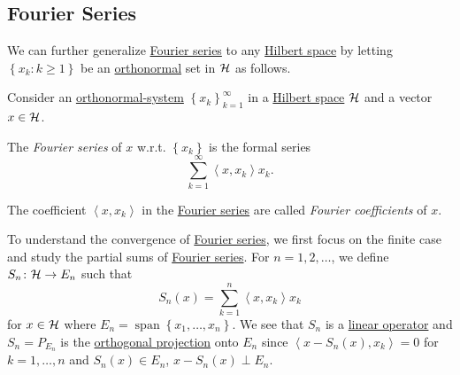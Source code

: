 \subsection{Fourier Series}
We can further generalize \hyperref[def:Fourier-series]{Fourier series} to any \hyperref[def:Hilbert-space]{Hilbert space} by letting \(\left\{ x_{k} \colon k\geq 1 \right\} \) be an \hyperref[def:orthonormal-system]{orthonormal} set in \(\mathcal{\MakeUppercase{h}} \) as follows.

\begin{definition*}
	Consider an \hyperref[def:orthonormal-system]{orthonormal-system} \(\left\{ x_k \right\} _{k=1}^{\infty} \) in a \hyperref[def:Hilbert-space]{Hilbert space} \(\mathcal{\MakeUppercase{h}} \) and a vector \(x\in \mathcal{\MakeUppercase{h}} \).
	\begin{definition}\label{def:Fourier-series}
		The \emph{Fourier series} of \(x\) w.r.t. \(\left\{ x_k \right\} \) is the formal series
		\[
			\sum_{k=1} ^{\infty} \left\langle x, x_k \right\rangle x_k.
		\]
	\end{definition}
	\begin{definition}\label{def:Fourier-coefficient}
		The coefficient \(\left\langle x, x_k \right\rangle \) in the \hyperref[def:Fourier-series]{Fourier series} are called \emph{Fourier coefficients} of \(x\).
	\end{definition}
\end{definition*}

To understand the convergence of \hyperref[def:Fourier-series]{Fourier series}, we first focus on the finite case and study the partial sums of \hyperref[def:Fourier-series]{Fourier series}. For \(n = 1, 2, \ldots  \), we define \(S_{n} \colon \mathcal{\MakeUppercase{h}} \to E_{n} \) such that
\[
	S_n (x)= \sum_{k=1}^{n} \left\langle x, x_{k}  \right\rangle x_{k}
\]
for \(x\in \mathcal{\MakeUppercase{h}} \) where \(E_{n} = \mathop{\mathrm{span}}\left\{ x_1, \ldots , x_{n}\right\}\). We see that \(S_n\) is a \hyperref[def:linear-map]{linear operator} and \(S_n= P_{E_n}\) is the \hyperref[def:orthogonal-projection]{orthogonal projection} onto \(E_n\) since \(\left\langle x -S_n(x), x_k \right\rangle = 0\) for \(k = 1, \ldots  , n\) and \(S_{n} (x)\in E_{n}\), \(x-S_n(x)\perp E_n\).

